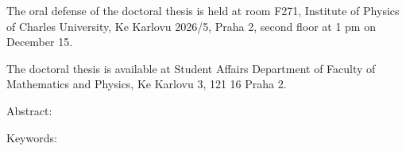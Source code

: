 \noindent%
The oral defense of the doctoral thesis is held at room F271, Institute of
Physics of Charles University, Ke Karlovu 2026/5, Praha 2, second floor at 1 pm
on December 15.

The doctoral thesis is available at Student Affairs Department of Faculty of
Mathematics and Physics, Ke Karlovu 3, 121 16 Praha 2.

\newpage

\noindent%
Abstract:
\Abstract
\vspace{5mm}

\noindent%
Keywords:
\Keywords


\openright
\pagestyle{plain}
\setcounter{page}{1}
